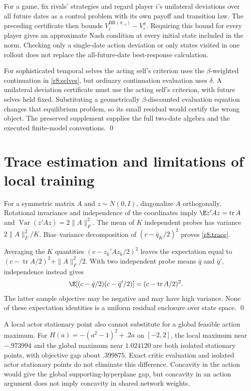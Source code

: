 For a game, fix rivals' strategies and regard player $i$'s unilateral deviations over all future dates as a control problem with its own payoff and transition law. The preceding certificate then bounds $V_i^{\mathrm{BR}(\pi_{-i})}-V_i^{\pi}$. Requiring this bound for every player gives an approximate Nash condition at every initial state included in the norm. Checking only a single-date action deviation or only states visited in one rollout does not replace the all-future-date best-response calculation.

For sophisticated temporal selves the acting self's criterion uses the $\beta$-weighted continuation in \eqref{r8:selves}, but ordinary continuation evaluation uses $\delta$. A unilateral deviation certificate must use the acting self's criterion, with future selves held fixed. Substituting a geometrically $\beta$-discounted evaluation equation changes that equilibrium problem, so its small residual would certify the wrong object. The preserved supplement supplies the full two-date algebra and the executed finite-model conventions. \qed

\section{Trace estimation and limitations of local training}\label{r8:proof:trace}
For a symmetric matrix $A$ and $z\sim N(0,I)$, diagonalize $A$ orthogonally. Rotational invariance and independence of the coordinates imply $\E z'Az=\operatorname{tr}A$ and $\operatorname{Var}(z'Az)=2\|A\|_F^2$. The mean of $K$ independent probes has variance $2\|A\|_F^2/K$. Bias--variance decomposition of $(c-\bar q_K/2)^2$ proves \eqref{r8:trace}.

Averaging the $K$ quantities $(c-z_k'Az_k/2)^2$ leaves the expectation equal to $(c-\operatorname{tr}A/2)^2+\|A\|_F^2/2$. With two independent probe means $\bar q$ and $\bar q'$, independence instead gives
\[
 \E[(c-\bar q/2)(c-\bar q'/2)]=(c-\operatorname{tr}A/2)^2.
\]
The latter sample objective may be negative and may have high variance. None of these expectation identities is a uniform residual enclosure over state space. \qed

A local actor stationary point also cannot substitute for a global feasible action maximum. For $H(a)=-(a^2-1)^2+.2a$ on $[-2,2]$, the local maximum near $-.973994$ and the global maximum near $1.024120$ are both isolated stationary points, with objective gap about $.399875$. Exact critic evaluation and isolated actor stationary points do not eliminate this difference. Concavity in the action would give the global supporting-hyperplane gap, but concavity in an action argument does not imply concavity in shared network weights.

